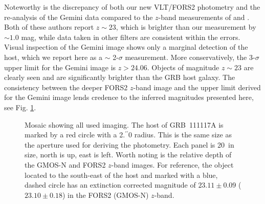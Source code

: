 \documentclass[referee]{aa}
\newcommand{\farc}{\hbox{$.\!\!^{\prime\prime}$}}
\begin{document}
Noteworthy is the discrepancy of both our new VLT/FORS2 photometry and the
re-analysis of the Gemini data compared to the $z$-band measurements of
\citet{Margutti2012} and \citet{Sakamoto2013}. Both of these authors report $z
\sim 23$, which is brighter than our measurement by $\sim 1.0$ mag, while data
taken in other filters are consistent within the errors. Visual inspection of
the Gemini image shows only a marginal detection of the host, which we report
here as a $\sim$ 2-$\sigma$ measurement. More conservatively, the 3-$\sigma$
upper limit for the Gemini image is $z > 24.06$. Objects of magnitude $z \sim
23$ are clearly seen and are significantly brighter than the GRB host galaxy.
The consistency between the deeper FORS2 $z$-band image and the upper limit
derived for the Gemini image lends credence to the inferred magnitudes presented
here, see Fig. \ref{fig:photplot}.

\begin{figure}
\caption{Mosaic showing all used imaging. The host of GRB~111117A is marked by
	a red circle with a 2\farc0 radius. This is the same size as the aperture used
	for deriving the photometry. Each panel is 20\arcsec~in size, north is up, east
	is left. Worth noting is the relative depth of the GMOS-N and FORS2 $z$-band
	images. For reference, the object located to the south-east of the host and
	marked with a blue, dashed circle has an extinction corrected magnitude of
	$23.11 \pm 0.09$ ($23.10 \pm 0.18$) in the FORS2 (GMOS-N) $z$-band.}
\label{fig:photplot}
\end{figure}
\end{document}
